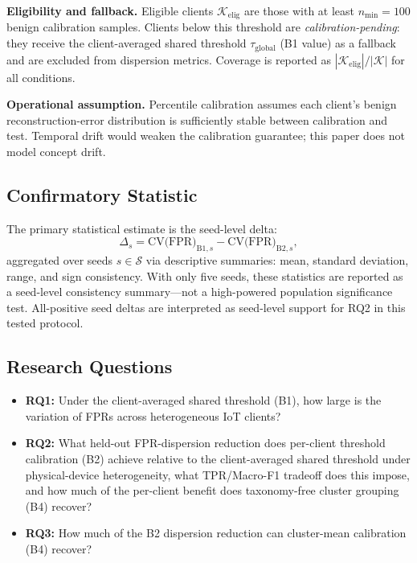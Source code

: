 \textbf{Eligibility and fallback.}
Eligible clients $\mathcal{K}_{\mathrm{elig}}$ are those with at least $n_{\min}{=}100$ benign calibration samples.
Clients below this threshold are \emph{calibration-pending}: they receive the client-averaged
shared threshold $\tau_{\text{global}}$ (B1 value) as a fallback and are excluded from
dispersion metrics.
Coverage is reported as $|\mathcal{K}_{\mathrm{elig}}|/|\mathcal{K}|$ for all conditions.

\textbf{Operational assumption.}
Percentile calibration assumes each client's benign reconstruction-error distribution
is sufficiently stable between calibration and test.
Temporal drift would weaken the calibration guarantee; this paper does not model concept drift.

\subsection{Confirmatory Statistic}
The primary statistical estimate is the seed-level delta:
\begin{equation}
  \Delta_s = \text{CV(FPR)}_{\text{B1},s} - \text{CV(FPR)}_{\text{B2},s},
\end{equation}
aggregated over seeds $s \in \mathcal{S}$ via descriptive summaries: mean, standard deviation, range, and sign consistency.
With only five seeds, these statistics are reported as a seed-level consistency summary---not a high-powered
population significance test.
All-positive seed deltas are interpreted as seed-level support
for RQ2 in this tested protocol.

\subsection{Research Questions}
\begin{itemize}
  \item \textbf{RQ1:} Under the client-averaged shared threshold (B1), how large is the variation of FPRs across heterogeneous IoT clients?
  \item \textbf{RQ2:} What held-out FPR-dispersion reduction does per-client threshold calibration (B2) achieve relative to the client-averaged shared threshold under physical-device heterogeneity, what TPR/Macro-F1 tradeoff does this impose, and how much of the per-client benefit does taxonomy-free cluster grouping (B4) recover?
  \item \textbf{RQ3:} How much of the B2 dispersion reduction can cluster-mean calibration (B4) recover?
\end{itemize}

